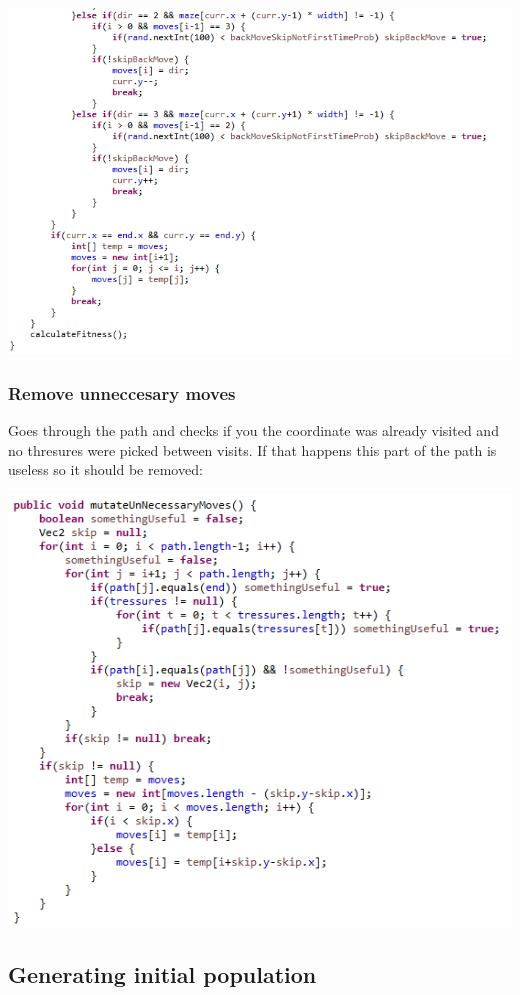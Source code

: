 \documentclass[12pt]{article} %
\begin{document}
\includegraphics[scale=1]{randomMovePathCorrectionMutation3}

\subsubsection{Remove unneccesary moves}
Goes through the path and checks if you the coordinate was already visited and no thresures were picked between visits. If that happens this part of the path
is useless so it should be removed:

\includegraphics[scale=1]{removeUnNeccesaryMovesMutation}


\subsection{Generating initial population}
\end{document}
